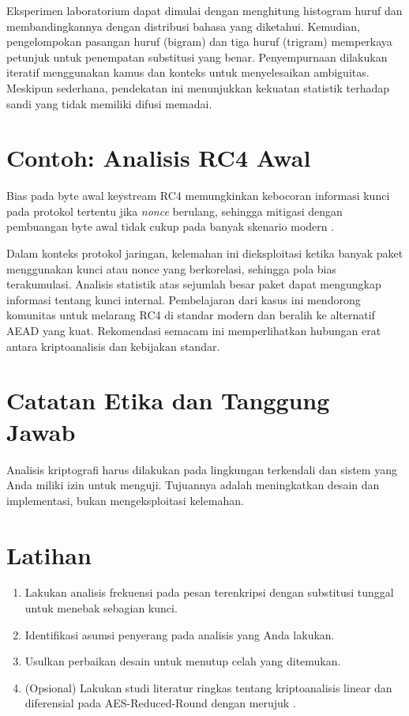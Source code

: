 \documentclass[../main.tex]{subfiles}
\begin{document}
Eksperimen laboratorium dapat dimulai dengan menghitung histogram huruf dan membandingkannya dengan distribusi bahasa yang diketahui. Kemudian, pengelompokan pasangan huruf (bigram) dan tiga huruf (trigram) memperkaya petunjuk untuk penempatan substitusi yang benar. Penyempurnaan dilakukan iteratif menggunakan kamus dan konteks untuk menyelesaikan ambiguitas. Meskipun sederhana, pendekatan ini menunjukkan kekuatan statistik terhadap sandi yang tidak memiliki difusi memadai.

\section{Contoh: Analisis RC4 Awal}
Bias pada byte awal keystream RC4 memungkinkan kebocoran informasi kunci pada protokol tertentu jika \emph{nonce} berulang, sehingga mitigasi dengan pembuangan byte awal tidak cukup pada banyak skenario modern \citep{rc4}.

Dalam konteks protokol jaringan, kelemahan ini dieksploitasi ketika banyak paket menggunakan kunci atau nonce yang berkorelasi, sehingga pola bias terakumulasi. Analisis statistik atas sejumlah besar paket dapat mengungkap informasi tentang kunci internal. Pembelajaran dari kasus ini mendorong komunitas untuk melarang RC4 di standar modern dan beralih ke alternatif AEAD yang kuat. Rekomendasi semacam ini memperlihatkan hubungan erat antara kriptoanalisis dan kebijakan standar.

\section{Catatan Etika dan Tanggung Jawab}
Analisis kriptografi harus dilakukan pada lingkungan terkendali dan sistem yang Anda miliki izin untuk menguji. Tujuannya adalah meningkatkan desain dan implementasi, bukan mengeksploitasi kelemahan.

\section{Latihan}
\begin{enumerate}
  \item Lakukan analisis frekuensi pada pesan terenkripsi dengan substitusi tunggal untuk menebak sebagian kunci.
  \item Identifikasi asumsi penyerang pada analisis yang Anda lakukan.
  \item Usulkan perbaikan desain untuk menutup celah yang ditemukan.
  \item (Opsional) Lakukan studi literatur ringkas tentang kriptoanalisis linear dan diferensial pada AES-Reduced-Round dengan merujuk \citep{heys_tutorial}.
\end{enumerate}
\end{document}
